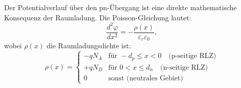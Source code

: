 ﻿\documentclass[12pt, a4paper]{article}
\begin{document}
	Der Potentialverlauf über den pn-Übergang ist eine direkte mathematische
	Konsequenz der Raumladung. Die Poisson-Gleichung lautet:
	\begin{equation}
		\frac{d^2 \varphi}{dx^2} = -\frac{\rho(x)}{\varepsilon_r \varepsilon_0},
	\end{equation}
	wobei $\rho(x)$ die Raumladungsdichte ist:
	\begin{equation}
		\rho(x) = \begin{cases}
			-q N_A & \text{für } -d_p \leq x < 0 \quad \text{(p-seitige RLZ)}\\
			+q N_D & \text{für } 0 < x \leq d_n \quad \text{(n-seitige RLZ)}\\
			0 & \text{sonst (neutrales Gebiet)}
		\end{cases}
	\end{equation}
	
\end{document}
